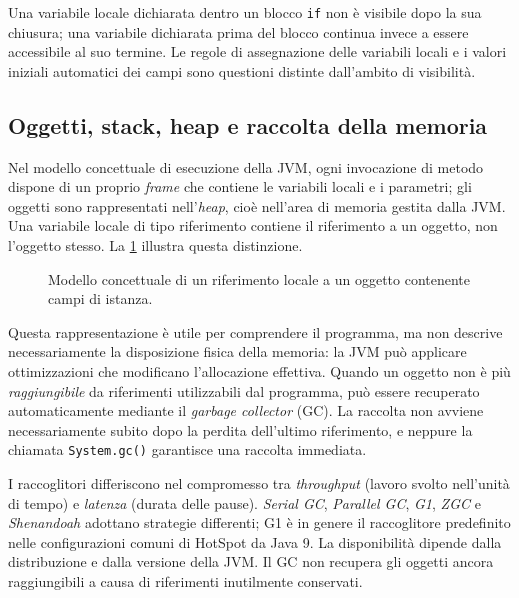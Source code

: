 Una variabile locale dichiarata dentro un blocco \texttt{if}
non è visibile dopo la sua chiusura; una variabile dichiarata
prima del blocco continua invece a essere accessibile al suo
termine. Le regole di assegnazione delle variabili locali e i valori
iniziali automatici dei campi sono questioni distinte
dall'ambito di visibilità.

\subsection{Oggetti, stack, heap e raccolta della memoria}
\label{sec:fi-java-cicli-memoria}

Nel modello concettuale di esecuzione della JVM, ogni invocazione
di metodo dispone di un proprio \emph{frame} che contiene le
variabili locali e i parametri; gli oggetti sono rappresentati
nell'\emph{heap}, cioè nell'area di memoria gestita dalla JVM.
Una variabile locale di tipo riferimento contiene il riferimento
a un oggetto, non l'oggetto stesso. La
\cref{fig:fi-java-cicli-memoria} illustra questa distinzione.

\begin{figure}[htbp]
  \centering
  
  \caption{Modello concettuale di un riferimento locale a un oggetto
  contenente campi di istanza.}
  \label{fig:fi-java-cicli-memoria}
\end{figure}

Questa rappresentazione è utile per comprendere il programma, ma
non descrive necessariamente la disposizione fisica della memoria:
la JVM può applicare ottimizzazioni che modificano l'allocazione
effettiva. Quando un oggetto non è più \emph{raggiungibile} da
riferimenti utilizzabili dal programma, può essere recuperato
automaticamente mediante il \emph{garbage collector} (GC).
La raccolta non avviene necessariamente subito dopo la perdita
dell'ultimo riferimento, e neppure la chiamata
\texttt{System.gc()} garantisce una raccolta immediata.

I raccoglitori differiscono nel compromesso tra
\emph{throughput} (lavoro svolto nell'unità di tempo) e
\emph{latenza} (durata delle pause). \emph{Serial GC},
\emph{Parallel GC}, \emph{G1}, \emph{ZGC} e
\emph{Shenandoah} adottano strategie differenti; G1 è in
genere il raccoglitore predefinito nelle configurazioni comuni
di HotSpot da Java 9. La disponibilità dipende dalla
distribuzione e dalla versione della JVM. Il GC non recupera
gli oggetti ancora raggiungibili a causa di riferimenti inutilmente
conservati.

